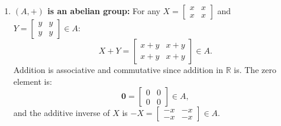 \begin{enumerate}
    \item \textbf{$(A, +)$ is an abelian group:}
    For any $X = \begin{bmatrix} x & x \\ x & x \end{bmatrix}$ and $Y = \begin{bmatrix} y & y \\ y & y \end{bmatrix} \in A$:
    \[
    X + Y = \begin{bmatrix} x+y & x+y \\ x+y & x+y \end{bmatrix} \in A.
    \]
    Addition is associative and commutative since addition in $\mathbb{R}$ is. The zero element is:
    \[
    \mathbf{0} = \begin{bmatrix} 0 & 0 \\ 0 & 0 \end{bmatrix} \in A,
    \]
    and the additive inverse of $X$ is $-X = \begin{bmatrix} -x & -x \\ -x & -x \end{bmatrix} \in A$.
    

\end{enumerate}
